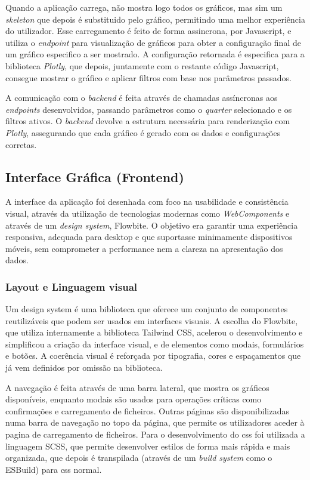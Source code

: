 Quando a aplicação carrega, não mostra logo todos os gráficos, mas sim um \textit{skeleton} que depois é substituido pelo gráfico, permitindo uma melhor experiência do utilizador. Esse carregamento é feito de forma assincrona, por Javascript, e utiliza o \textit{endpoint} para visualização de gráficos para obter a configuração final de um gráfico especifico a ser mostrado. A configuração retornada é especifica para a biblioteca \textit{Plotly}, que depois, juntamente com o restante código Javascript, consegue mostrar o gráfico e aplicar filtros com base nos parâmetros passados.

A comunicação com o \textit{backend} é feita através de chamadas assíncronas aos \textit{endpoints} desenvolvidos, passando parâmetros como o \textit{quarter} selecionado e os filtros ativos. O \textit{backend} devolve a estrutura necessária para renderização com \textit{Plotly}, assegurando que cada gráfico é gerado com os dados e configurações corretas.

\subsection{Interface Gráfica (Frontend)}

A interface da aplicação foi desenhada com foco na usabilidade e consistência visual, através da utilização de tecnologias modernas como \textit{WebComponents} e através de um \textit{design system}, Flowbite. O objetivo era garantir uma experiência responsiva, adequada para desktop e que suportasse minimamente dispositivos móveis, sem comprometer a performance nem a clareza na apresentação dos dados.

\subsubsection{Layout e Linguagem visual}

Um design system é uma biblioteca que oferece um conjunto de componentes reutilizáveis que podem ser usados em interfaces visuais. A escolha do Flowbite, que utiliza internamente a biblioteca Tailwind CSS, acelerou o desenvolvimento e simplificou a criação da interface visual, e de elementos como modais, formulários e botões. A coerência visual é reforçada por tipografia, cores e espaçamentos que já vem definidos por omissão na biblioteca.

A navegação é feita através de uma barra lateral, que mostra os gráficos disponíveis, enquanto modais são usados para operações críticas como confirmações e carregamento de ficheiros. Outras páginas são disponibilizadas numa barra de navegação no topo da página, que permite os utilizadores aceder à pagina de carregamento de ficheiros. Para o desenvolvimento do \gls{css} foi utilizada a linguagem SCSS, que permite desenvolver estilos de forma mais rápida e mais organizada, que depois é transpilada (através de um \textit{build system} como o ESBuild\cite{esbuild}) para \gls{css} normal.

